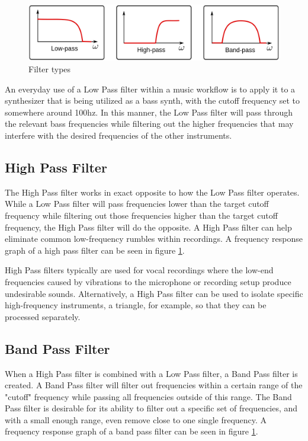 \documentclass[a4paper,12pt]{report}
\begin{document}
\begin{figure}
    \centering
    \includegraphics[width=36em]{FilterTypes.jpg}
    \caption{Filter types}
    \label{fig:FilterTypes}
\end{figure}

An everyday use of a Low Pass filter within a music workflow is to apply it to a synthesizer that is being utilized as a bass synth, with the cutoff frequency set to somewhere around 100hz. In this manner, the Low Pass filter will pass through the relevant bass frequencies while filtering out the higher frequencies that may interfere with the desired frequencies of the other instruments.

\subsection{High Pass Filter}
\label{subsec:highpassfilter}
The High Pass filter works in exact opposite to how the Low Pass filter operates. While a Low Pass filter will pass frequencies lower than the target cutoff frequency while filtering out those frequencies higher than the target cutoff frequency, the High Pass filter will do the opposite. A High Pass filter can help eliminate common low-frequency rumbles within recordings. A frequency response graph of a high pass filter can be seen in figure \ref{fig:FilterTypes}.

High Pass filters typically are used for vocal recordings where the low-end frequencies caused by vibrations to the microphone or recording setup produce undesirable sounds. Alternatively, a High Pass filter can be used to isolate specific high-frequency instruments, a triangle, for example, so that they can be processed separately.

\subsection{Band Pass Filter}
\label{subsec:bandpassfilter}
When a High Pass filter is combined with a Low Pass filter, a Band Pass filter is created. A Band Pass filter will filter out frequencies within a certain range of the "cutoff" frequency while passing all frequencies outside of this range. The Band Pass filter is desirable for its ability to filter out a specific set of frequencies, and with a small enough range, even remove close to one single frequency. A frequency response graph of a band pass filter can be seen in figure \ref{fig:FilterTypes}.
\end{document}
